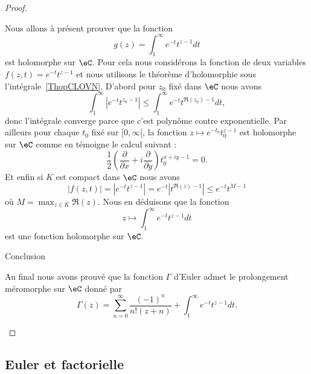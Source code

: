 \begin{proof}
\begin{subproof}
		Nous allons à présent prouver que la fonction
		\begin{equation}
			g(z)=\int_1^{\infty} e^{-t}t^{z-1}dt
		\end{equation}
		est holomorphe sur \( \eC\). Pour cela nous considérons la fonction de deux variables \( f(z,t)= e^{-t}t^{z-1}\) et nous utilisons le théorème d'holomorphie sous l'intégrale~\ref{ThopCLOVN}. D'abord pour \( z_0\) fixé dans \( \eC\) nous avons
		\begin{equation}
			\int_1^{\infty}|  e^{-t}t^{z_0-1} |\leq \int_1^{\infty} e^{-t}t^{\Re(z_0)-1}dt,
		\end{equation}
		donc l'intégrale converge parce que c'est polynôme contre exponentielle. Par ailleurs pour chaque \( t_0\) fixé sur \( \mathopen[ 0 , \infty [\), la fonction \( z\mapsto  e^{-t_0}t_0^{z-1}\) est holomorphe sur \( \eC\) comme en témoigne le calcul suivant :
		\begin{equation}
			\frac{ 1 }{2}\left( \frac{ \partial  }{ \partial x }+i\frac{ \partial  }{ \partial y } \right)t_0^{x+iy-1}=0.
		\end{equation}
		Et enfin si \( K\) est compact dans \( \eC\) nous avons
		\begin{equation}
			| f(z,t) |=|  e^{-t}t^{z-1} |= e^{-t}| t^{\Re(z)-1} |\leq  e^{-t}t^{M-1}
		\end{equation}
		où \( M=\max_{z\in K}\Re(z)\). Nous en déduisons que la fonction
		\begin{equation}
			z\mapsto\int_1^{\infty} e^{-t}t^{z-1}dt
		\end{equation}
		est une fonction holomorphe sur \( \eC\).

		\item[Conclusion]

		Au final nous avons prouvé que la fonction \( \Gamma\) d'Euler admet le prolongement méromorphe sur \( \eC\) donné par
		\begin{equation}
			\Gamma(z)=\sum_{n=0}^{\infty}\frac{ (-1)^n }{ n!(z+n) }+\int_1^{\infty} e^{-t}t^{z-1}dt.
		\end{equation}
	\end{subproof}
\end{proof}

\subsection{Euler et factorielle}


